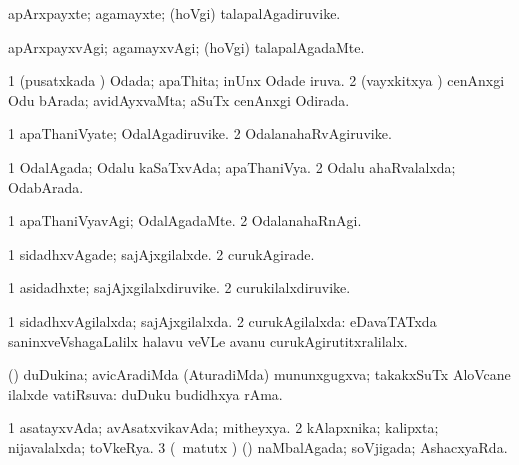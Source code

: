 \bentry
{} 
\gl{\nA}
\expl{}
\bmng
apArxpayxte; agamayxte; (hoVgi) talapalAgadiruvike. 
\emng
\eentry

\bentry
{} 
\gl{\kirxvi}
\expl{}
\bmng
apArxpayxvAgi; agamayxvAgi; (hoVgi) talapalAgadaMte. 
\emng
\eentry

\bentry
{} 
\gl{\gu}
\expl{}
\bmng
\bnum
\num{1} (pusatxkada \vi) Odada; apaThita; inUnx Odade iruva. 
\num{2} (vayxkitxya \vi) cenAnxgi Odu bArada; avidAyxvaMta; aSuTx cenAnxgi Odirada. 
\enum
\emng
\eentry

\bentry
{} 
\gl{\nA}
\expl{}
\bmng
\bnum
\num{1} apaThaniVyate; OdalAgadiruvike. 
\num{2} OdalanahaRvAgiruvike. 
\enum
\emng
\eentry

\bentry
{} 
\gl{\gu}
\expl{}
\bmng
\bnum
\num{1} OdalAgada; Odalu kaSaTxvAda; apaThaniVya. 
\num{2} Odalu ahaRvalalxda; OdabArada. 
\enum
\emng
\eentry

\bentry
{} 
\gl{\kirxvi}
\expl{}
\bmng
\bnum
\num{1} apaThaniVyavAgi; OdalAgadaMte. 
\num{2} OdalanahaRnAgi. 
\enum
\emng
\eentry

\bentry
{} 
\gl{\kirxvi}
\expl{}
\bmng
\bnum
\num{1} sidadhxvAgade; sajAjxgilalxde. 
\num{2} curukAgirade. 
\enum
\emng
\eentry

\bentry
{} 
\gl{\nA}
\expl{}
\bmng
\bnum
\num{1} asidadhxte; sajAjxgilalxdiruvike. 
\num{2} curukilalxdiruvike. 
\enum
\emng
\eentry

\bentry
{} 
\gl{\gu}
\expl{}
\bmng
\bnum
\num{1} sidadhxvAgilalxda; sajAjxgilalxda. 
\num{2} curukAgilalxda:  eDavaTATxda saninxveVshagaLalilx halavu veVLe avanu curukAgirutitxralilalx. 
\enum
\emng
\eentry

\bentry
{} 
\gl{\gu}
\expl{}
\bmng
(\pArxparx) duDukina; avicAradiMda (AturadiMda) mununxgugxva; takakxSuTx AloVcane ilalxde vatiRsuva:  duDuku budidhxya rAma. 
\emng
\eentry

\bentry
{} 
\gl{\gu}
\expl{}
\bmng
\bnum
\num{1} asatayxvAda; avAsatxvikavAda; mitheyxya. 
\num{2} kAlapxnika; kalipxta; nijavalalxda; toVkeRya. 
\num{3} (\ame\ matutx \AseTxrXV) (\ashi) naMbalAgada; soVjigada; AshacxyaRda. 
\enum
\emng
\eentry

